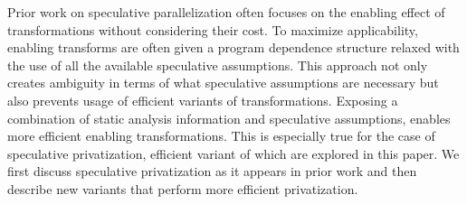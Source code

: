 Prior work on speculative parallelization often focuses on the
enabling effect of transformations without considering their cost.  To
maximize applicability, enabling transforms are often given a program
dependence structure relaxed with the use of all the available
speculative assumptions.  This approach not only creates ambiguity in
terms of what speculative assumptions are necessary but also prevents
usage of efficient variants of transformations.
%
Exposing a combination of static analysis information and speculative
assumptions, \name enables more efficient enabling transformations.
This is especially true for the case of speculative privatization,
efficient variant of which are explored in this paper.
%
We first discuss speculative privatization as it appears in prior work
and then describe new variants that perform more efficient
privatization.





%
%








